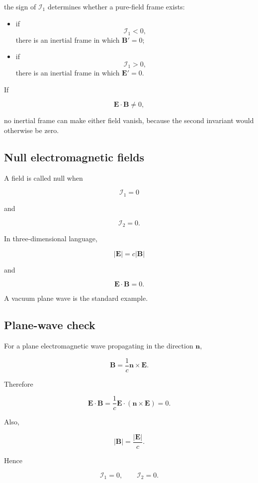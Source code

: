 the sign of \(\mathcal{I}_1\) determines whether a pure-field frame exists:

\begin{itemize}
    \item if
    \[
    \mathcal{I}_1<0,
    \]
    there is an inertial frame in which \(\mathbf{B}'=0\);

    \item if
    \[
    \mathcal{I}_1>0,
    \]
    there is an inertial frame in which \(\mathbf{E}'=0\).
\end{itemize}

If

\[
\mathbf{E}\cdot\mathbf{B}\neq0,
\]

no inertial frame can make either field vanish, because the second invariant would otherwise be zero.

\subsection{Null electromagnetic fields}

A field is called null when

\[
\boxed{
\mathcal{I}_1=0
}
\]

and

\[
\boxed{
\mathcal{I}_2=0
}.
\]

In three-dimensional language,

\[
|\mathbf{E}|=c|\mathbf{B}|
\]

and

\[
\mathbf{E}\cdot\mathbf{B}=0.
\]

A vacuum plane wave is the standard example.

\subsection{Plane-wave check}

For a plane electromagnetic wave propagating in the direction \(\mathbf{n}\),

\[
\mathbf{B}
=
\frac{1}{c}
\mathbf{n}\times\mathbf{E}.
\]

Therefore

\[
\mathbf{E}\cdot\mathbf{B}
=
\frac{1}{c}
\mathbf{E}\cdot
\left(
\mathbf{n}\times\mathbf{E}
\right)
=0.
\]

Also,

\[
|\mathbf{B}|
=
\frac{|\mathbf{E}|}{c}.
\]

Hence

\[
\mathcal{I}_1=0,
\qquad
\mathcal{I}_2=0.
\]

